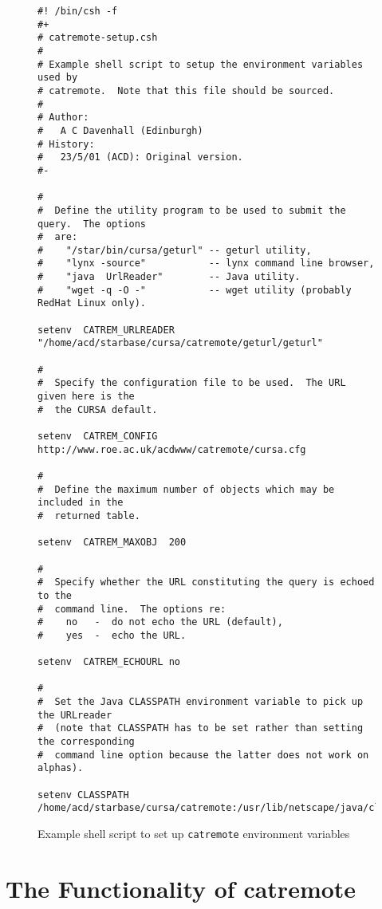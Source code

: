 \documentclass[twoside,11pt]{article}
\newcommand{\xlabel}[1]{}
\renewcommand{\_}{\texttt{\symbol{95}}}
\begin{document}
\begin{figure}[htbp]

{\small
\begin{verbatim}
#! /bin/csh -f
#+
# catremote-setup.csh
#
# Example shell script to setup the environment variables used by
# catremote.  Note that this file should be sourced.
#
# Author:
#   A C Davenhall (Edinburgh)
# History:
#   23/5/01 (ACD): Original version.
#-

#
#  Define the utility program to be used to submit the query.  The options
#  are:
#    "/star/bin/cursa/geturl" -- geturl utility, 
#    "lynx -source"           -- lynx command line browser,
#    "java  UrlReader"        -- Java utility.
#    "wget -q -O -"           -- wget utility (probably RedHat Linux only).

setenv  CATREM_URLREADER "/home/acd/starbase/cursa/catremote/geturl/geturl"

#
#  Specify the configuration file to be used.  The URL given here is the
#  the CURSA default.

setenv  CATREM_CONFIG  http://www.roe.ac.uk/acdwww/catremote/cursa.cfg

#
#  Define the maximum number of objects which may be included in the
#  returned table.

setenv  CATREM_MAXOBJ  200

#
#  Specify whether the URL constituting the query is echoed to the
#  command line.  The options re:
#    no   -  do not echo the URL (default),
#    yes  -  echo the URL.

setenv  CATREM_ECHOURL no

#
#  Set the Java CLASSPATH environment variable to pick up the URLreader
#  (note that CLASSPATH has to be set rather than setting the corresponding
#  command line option because the latter does not work on alphas).

setenv CLASSPATH /home/acd/starbase/cursa/catremote:/usr/lib/netscape/java/classes
\end{verbatim}
}

\begin{quote}
\caption{Example shell script to set up {\tt catremote} environment
variables  \label{SETENVAR} }
\end{quote}

\end{figure}


\section{\xlabel{FUNC}\label{FUNC}The Functionality of catremote}
\end{document}
